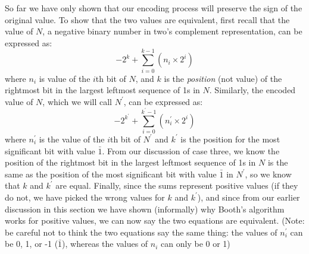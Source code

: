 \documentclass{article}
\begin{document}
So far we have only shown that our encoding process will preserve the sign of the original value.
To show that the two values are equivalent, first recall that the value of $N$, a negative binary number in two's complement representation, can be expressed as:
\[-2^k + \sum_{i=0}^{k-1} (n_i \times 2^i)\]
where $n_i$ is value of the $i$th bit of $N$, and $k$ is the \emph{position} (not value) of the rightmost bit in the largest leftmost sequence of 1s in $N$.
Similarly, the encoded value of $N$, which we will call $N^{\prime}$, can be expressed as:
\[-2^{k^{\prime}} + \sum_{i=0}^{k^{\prime}-1} (n_i^{\prime} \times 2^i)\]
where $n_i^{\prime}$ is the value of the $i$th bit of $N^{\prime}$ and $k^{\prime}$ is the position for the most significant bit with value $\bar{1}$.
From our discussion of case three, we know the position of the rightmost bit in the largest leftmost sequence of 1s in $N$ is the same as the position of the most significant bit with value $\bar{1}$ in $N^{\prime}$, so we know that $k$ and $k^{\prime}$ are equal.
Finally, since the sums represent positive values (if they do not, we have picked the wrong values for $k$ and $k^{\prime}$), and since from our earlier discussion in this section we have shown (informally) why Booth's algorithm works for positive values, we can now say the two equations are equivalent.
(Note: be careful not to think the two equations say the same thing: the values of $n_i^{\prime}$ can be 0, 1, or -1 ($\bar{1}$), whereas the values of $n_i$ can only be 0 or 1)



%
%
\end{document}
